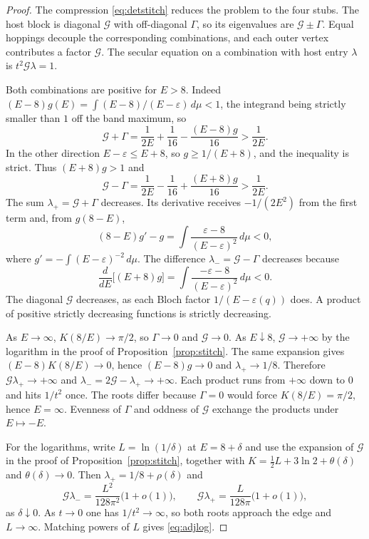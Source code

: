 \begin{proof}
The compression \eqref{eq:detstitch} reduces the problem to the four
stubs.
The host block is diagonal \(\mathcal{G}\) with off-diagonal \(\Gamma\),
so its eigenvalues are \(\mathcal{G}\pm\Gamma\).
Equal hoppings decouple the corresponding combinations, and each outer
vertex contributes a factor \(\mathcal{G}\).
The secular equation on a combination with host entry \(\lambda\) is
\(t^2\mathcal{G}\lambda=1\).

Both combinations are positive for \(E>8\).
Indeed \((E-8)g(E)=\int (E-8)/(E-\varepsilon)\,d\mu<1\), the integrand
being strictly smaller than \(1\) off the band maximum, so
\[
\mathcal{G}+\Gamma
=\frac{1}{2E}+\frac{1}{16}-\frac{(E-8)g}{16}
>\frac{1}{2E}.
\]
In the other direction \(E-\varepsilon\le E+8\), so \(g\ge 1/(E+8)\), and
the inequality is strict.
Thus \((E+8)g>1\) and
\[
\mathcal{G}-\Gamma
=\frac{1}{2E}-\frac{1}{16}+\frac{(E+8)g}{16}
>\frac{1}{2E}.
\]
The sum \(\lambda_+=\mathcal{G}+\Gamma\) decreases.
Its derivative receives \(-1/(2E^2)\) from the first term and, from
\(g(8-E)\),
\[
(8-E)g'-g
=\int\frac{\varepsilon-8}{(E-\varepsilon)^2}\,d\mu<0,
\]
where \(g'=-\int(E-\varepsilon)^{-2}\,d\mu\).
The difference \(\lambda_-=\mathcal{G}-\Gamma\) decreases because
\[
\frac{d}{dE}\bigl[(E+8)g\bigr]
=\int\frac{-\varepsilon-8}{(E-\varepsilon)^2}\,d\mu<0.
\]
The diagonal \(\mathcal{G}\) decreases, as each Bloch factor
\(1/(E-\varepsilon(q))\) does.
A product of positive strictly decreasing functions is strictly
decreasing.

As \(E\to\infty\), \(K(8/E)\to\pi/2\), so \(\Gamma\to 0\) and
\(\mathcal{G}\to 0\).
As \(E\downarrow 8\), \(\mathcal{G}\to+\infty\) by the logarithm in the
proof of Proposition~\ref{prop:stitch}.
The same expansion gives \((E-8)K(8/E)\to 0\), hence
\((E-8)g\to 0\) and \(\lambda_+\to 1/8\).
Therefore \(\mathcal{G}\lambda_+\to+\infty\) and
\(\lambda_-=2\mathcal{G}-\lambda_+\to+\infty\).
Each product runs from \(+\infty\) down to \(0\) and hits \(1/t^2\) once.
The roots differ because \(\Gamma=0\) would force \(K(8/E)=\pi/2\), hence
\(E=\infty\).
Evenness of \(\Gamma\) and oddness of \(\mathcal{G}\) exchange the products
under \(E\mapsto -E\).

For the logarithms, write \(L=\ln(1/\delta)\) at \(E=8+\delta\) and use the
expansion of \(\mathcal{G}\) in the proof of Proposition~\ref{prop:stitch},
together with \(K=\tfrac12 L+3\ln 2+\theta(\delta)\) and \(\theta(\delta)\to 0\).
Then \(\lambda_+=1/8+\rho(\delta)\) and
\[
\mathcal{G}\lambda_-
=\frac{L^2}{128\pi^2}\bigl(1+o(1)\bigr),
\qquad
\mathcal{G}\lambda_+
=\frac{L}{128\pi}\bigl(1+o(1)\bigr),
\]
as \(\delta\downarrow 0\).
As \(t\to 0\) one has \(1/t^2\to\infty\), so both roots approach the edge
and \(L\to\infty\).
Matching powers of \(L\) gives \eqref{eq:adjlog}.


\end{proof}
